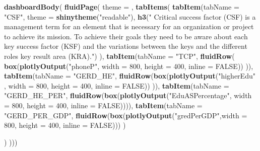 \documentclass[]{article}
\newenvironment{Shaded}{\begin{snugshade}}{\end{snugshade}}
\newcommand{\DataTypeTok}[1]{\textcolor[rgb]{0.13,0.29,0.53}{#1}}
\newcommand{\DecValTok}[1]{\textcolor[rgb]{0.00,0.00,0.81}{#1}}
\newcommand{\KeywordTok}[1]{\textcolor[rgb]{0.13,0.29,0.53}{\textbf{#1}}}
\newcommand{\NormalTok}[1]{#1}
\newcommand{\OtherTok}[1]{\textcolor[rgb]{0.56,0.35,0.01}{#1}}
\newcommand{\StringTok}[1]{\textcolor[rgb]{0.31,0.60,0.02}{#1}}
\begin{document}
\begin{Shaded}
\begin{Highlighting}[]
    \KeywordTok{dashboardBody}\NormalTok{(}
        \KeywordTok{fluidPage}\NormalTok{(  }\DataTypeTok{theme =}\NormalTok{ ,}
            \KeywordTok{tabItems}\NormalTok{(}
                \KeywordTok{tabItem}\NormalTok{(}\DataTypeTok{tabName =} \StringTok{"CSF"}\NormalTok{, }\DataTypeTok{theme =} \KeywordTok{shinytheme}\NormalTok{(}\StringTok{"readable"}\NormalTok{),}
                        \KeywordTok{h3}\NormalTok{(}\StringTok{" Critical success factor (CSF) is a management term for an }
\StringTok{              element that is necessary for an organization or}
\StringTok{              project to achieve its mission. To achieve their goals they}
\StringTok{              need to be aware about each key success factor}
\StringTok{                 (KSF) and the variations between the keys and the  }
\StringTok{                 different roles key result area (KRA)."}\NormalTok{)}
\NormalTok{                ),}
                \KeywordTok{tabItem}\NormalTok{(}\DataTypeTok{tabName =} \StringTok{"TCP"}\NormalTok{, }\KeywordTok{fluidRow}\NormalTok{( }\KeywordTok{box}\NormalTok{(}\KeywordTok{plotlyOutput}\NormalTok{(}\StringTok{"phoneP"}\NormalTok{, }\DataTypeTok{width =} \DecValTok{800}\NormalTok{, }\DataTypeTok{height =} \DecValTok{400}\NormalTok{, }\DataTypeTok{inline =} \OtherTok{FALSE}\NormalTok{))}
\NormalTok{                )),}
                \KeywordTok{tabItem}\NormalTok{(}\DataTypeTok{tabName =} \StringTok{"GERD_HE"}\NormalTok{, }\KeywordTok{fluidRow}\NormalTok{(}\KeywordTok{box}\NormalTok{(}\KeywordTok{plotlyOutput}\NormalTok{(}\StringTok{"higherEdu"}\NormalTok{ , }\DataTypeTok{width =} \DecValTok{800}\NormalTok{, }\DataTypeTok{height =} \DecValTok{400}\NormalTok{, }\DataTypeTok{inline =} \OtherTok{FALSE}\NormalTok{))}
\NormalTok{                )),}
                \KeywordTok{tabItem}\NormalTok{(}\DataTypeTok{tabName =} \StringTok{"GERD_HE_PER"}\NormalTok{, }\KeywordTok{fluidRow}\NormalTok{(}\KeywordTok{box}\NormalTok{(}\KeywordTok{plotlyOutput}\NormalTok{(}\StringTok{"EduASPercentage"}\NormalTok{, }\DataTypeTok{width =} \DecValTok{800}\NormalTok{, }\DataTypeTok{height =} \DecValTok{400}\NormalTok{, }\DataTypeTok{inline =} \OtherTok{FALSE}\NormalTok{)))),}
                \KeywordTok{tabItem}\NormalTok{(}\DataTypeTok{tabName =} \StringTok{"GERD_PER_GDP"}\NormalTok{, }\KeywordTok{fluidRow}\NormalTok{(}\KeywordTok{box}\NormalTok{(}\KeywordTok{plotlyOutput}\NormalTok{(}\StringTok{"gredPerGDP"}\NormalTok{,}\DataTypeTok{width =} \DecValTok{800}\NormalTok{, }\DataTypeTok{height =} \DecValTok{400}\NormalTok{, }\DataTypeTok{inline =} \OtherTok{FALSE}\NormalTok{))) )}

                
\NormalTok{            )}
\NormalTok{        )))}
\end{Highlighting}
\end{Shaded}
\end{document}
